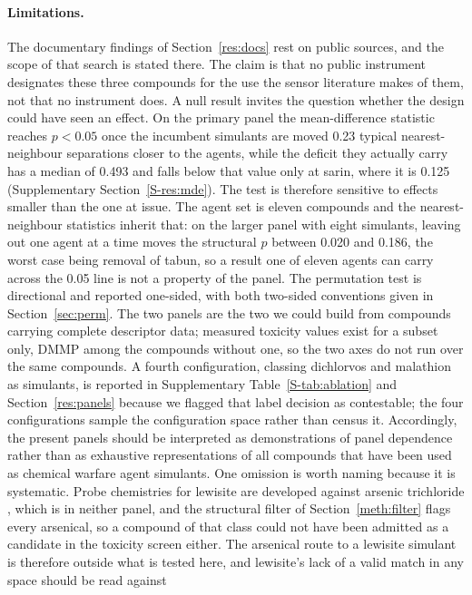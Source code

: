 \documentclass[1p,times]{elsarticle}
\begin{document}
\paragraph{Limitations.} The documentary findings of
Section~\ref{res:docs} rest on public sources, and the scope of that search
is stated there. The claim is that no public instrument designates these three
compounds for the use the sensor literature makes of them, not that no
instrument does. A null result invites the question whether the design could have seen an
effect. On the primary panel the mean-difference statistic reaches $p<0.05$ once
the incumbent simulants are moved 0.23 typical nearest-neighbour separations
closer to the agents, while the deficit they actually carry has a median of
0.493 and falls below that value only at sarin, where it is 0.125
(Supplementary Section~\ref{S-res:mde}). The test is therefore sensitive to effects
smaller than the one at issue. The
agent set is eleven compounds and the nearest-neighbour statistics inherit that:
on the larger panel with eight simulants, leaving out one agent at a time moves
the structural $p$ between 0.020 and 0.186, the worst case being removal of
tabun, so a result one of eleven agents can carry across the 0.05 line is not a
property of the panel. The
permutation test is directional and reported one-sided, with both two-sided
conventions given in Section~\ref{sec:perm}. The two panels are the two we could
build from compounds carrying complete descriptor data; measured toxicity values
exist for a subset only, DMMP among the compounds without one, so the two axes do
not run over the same compounds. A fourth configuration,
classing dichlorvos and malathion as simulants, is reported in
Supplementary Table~\ref{S-tab:ablation} and Section~\ref{res:panels} because we
flagged that
label decision as contestable; the four configurations sample the configuration
space rather than census it. Accordingly, the present panels should be
interpreted as demonstrations of panel dependence rather than as exhaustive
representations of all compounds that have been used as chemical warfare agent
simulants. One omission is worth naming because it is systematic. Probe
chemistries for lewisite are developed against arsenic trichloride
\cite{lee2016lewisite}, which is in neither panel, and the structural filter of
Section~\ref{meth:filter} flags every arsenical, so a compound of that class
could not have been admitted as a candidate in the toxicity screen either. The
arsenical route to a lewisite simulant is therefore outside what is tested
here, and lewisite's lack of a valid match in any space should be read against
\end{document}
